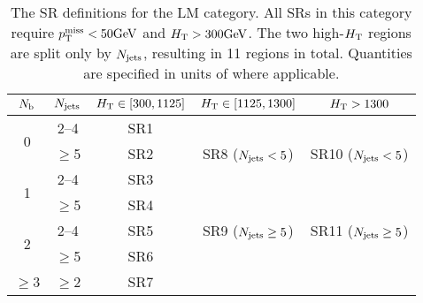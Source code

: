 \begin{table*}[htb!]
    \centering
            \begin{tabular}{|c|c|c|c|c|}
                \hline
                $N_\mathrm{b}$                      & $N_\text{jets}$ & $H_{\mathrm{T}}\in[300,1125]$ & $H_{\mathrm{T}}\in[1125,1300]$                 & $H_{\mathrm{T}}> 1300$ \\ \hline
                \multirow{2}{*}{0}             & 2--4      & SR1                    & \multirow{3}{*}{SR8 ($N_\text{jets}<5$)}       & \multirow{3}{*}{SR10 ($N_\text{jets}<5$)}       \\ \cline{2-3}
                                               & $\geq$5       & SR2                    &                                         &                                           \\ \cline{1-3}
                \multirow{2}{*}{1}             & 2--4      & SR3                    &                                         &                                                                                     \\ \cline{2-3}
                                               & $\geq$5       & SR4                    & \multirow{3}{*}{SR9 ($N_\text{jets}\geq 5$)}       & \multirow{3}{*}{SR11 ($N_\text{jets}\geq 5$)}        \\ \cline{1-3}
                \multirow{2}{*}{2}             & 2--4      & SR5                    &                                         &                                                                                      \\ \cline{2-3}
                                               & $\geq$5       & SR6                    &                                         &                                                                                       \\ \cline{1-3}
                $\geq$3                        & $\geq$2       & SR7                    &                                         &                                           \\ \hline
        \end{tabular}
        \caption{\label{tab:SRDefLM}  The SR definitions for the LM category. All SRs in this category require $p_{\mathrm{T}}^\text{miss} < 50\text{GeV}$ and $H_{\mathrm{T}}>300\text{GeV}$.
        The two high-$H_{\mathrm{T}}$ regions are split only by $N_\text{jets}$, resulting in 11 regions in total.
        Quantities are specified in units of \GeV where applicable.}
\end{table*}


